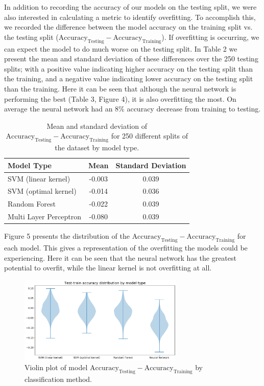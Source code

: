 \documentclass[12pt]{article}
\begin{document}
In addition to recording the accuracy of our models on the testing split, we were also interested in calculating a metric to identify overfitting. To accomplish this, we recorded the difference between the model accuracy on the training split vs. the testing split ($\text{Accuracy}_{\text{Testing}} - \text{Accuracy}_{\text{Training}}$). If overfitting is occurring, we can expect the model to do much worse on the testing split. In Table 2 we present the mean and standard deviation of these differences over the 250 testing splits; with a positive value indicating higher accuracy on the testing split than the training, and a negative value indicating lower accuracy on the testing split than the training. Here it can be seen that although the neural network is performing the best (Table 3, Figure 4), it is also overfitting the most. On average the neural network had an 8\% accuracy decrease from training to testing.

\begin{table}[H]
\centering
\begin{tabular}{|l|c|c|}
\hline
\multicolumn{1}{|l|}{Model Type} & Mean & \multicolumn{1}{l|}{Standard Deviation} \\ \hline
SVM (linear kernel) & -0.003 & 0.039 \\
\hline
SVM (optimal kernel) & -0.014 & 0.036 \\
\hline
Random Forest & -0.022 & 0.039 \\
\hline
Multi Layer Perceptron & -0.080 & 0.039 \\
\hline
\end{tabular}
\caption{ Mean and standard deviation of $\text{Accuracy}_{\text{Testing}} - \text{Accuracy}_{\text{Training}}$ for 250 different splits of the dataset by model type.}
\end{table}

Figure 5 presents the distribution of the $\text{Accuracy}_{\text{Testing}} - \text{Accuracy}_{\text{Training}}$ for each model. This gives a representation of the overfitting the models could be experiencing. Here it can be seen that the neural network has the greatest potential to overfit, while the linear kernel is not overfitting at all. 

\begin{figure}[H]
\centering
\includegraphics[width=0.7\textwidth]{testOut2}
\caption{ Violin plot of model $\text{Accuracy}_{\text{Testing}} - \text{Accuracy}_{\text{Training}}$ by classification method.}
\end{figure}
\end{document}
